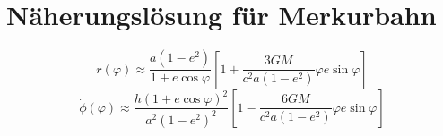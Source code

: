 \section{Näherungslösung für Merkurbahn}
\[ r(\varphi) \approx \frac{a(1-e^2)}{1 + e\cos\varphi} \left[1 + \frac{3GM}{c^2a(1-e^2)}\varphi e\sin\varphi\right] \]
\[ \dot{\phi}(\varphi) \approx \frac{h(1 + e\cos\varphi)^2}{a^2(1-e^2)^2} \left[1 - \frac{6GM}{c^2a(1-e^2)}\varphi e\sin\varphi\right] \]